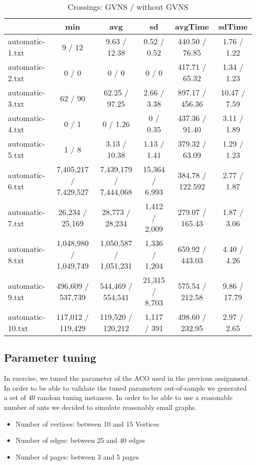 \documentclass{scrartcl}
\begin{document}
\begin{table}
\scriptsize
\begin{tabular}{lccccc}
  \toprule  & min & avg & sd & avgTime & sdTime \\ 
  \midrule automatic-1.txt & 9 / 12 & 9.63 / 12.38 & 0.52 / 0.52 & 440.50 / 76.85 & 1.76 / 1.22 \\ 
  automatic-2.txt & 0 / 0 & 0 / 0  & 0 / 0 & 417.71 / 65.32 & 1.34 / 1.23 \\ 
  automatic-3.txt & 62 / 90 & 62.25 / 97.25 & 2.66 / 3.38 & 897.17 / 456.36 & 10.47 / 7.59 \\ 
  automatic-4.txt & 0 / 1 & 0 / 1.26 & 0 / 0.35 & 437.36 / 91.40 & 3.11 / 1.89 \\ 
  automatic-5.txt & 1 / 8 & 3.13 / 10.38 & 1.13 / 1.41 & 379.32 / 63.09 & 1.29 / 1.23 \\ 
  automatic-6.txt & 7,405,217 / 7,429,527 & 7,439,179 / 7,444,068 & 15,364 / 6,993 & 384.78 / 122.592 & 2.77 / 1.87 \\ 
  automatic-7.txt & 26,234 / 25,169 & 28,773 / 28,234 & 1,412 / 2,009 & 279.07 / 165.43 & 1.87 / 3.06 \\ 
  automatic-8.txt & 1,048,980 / 1,049,749 & 1,050,587 / 1,051,231  & 1,336 / 1,204 & 659.92 / 443.03 & 4.40 / 4.26 \\ 
  automatic-9.txt & 496,609 / 537,739 & 544,469 / 554,541 & 21,315 / 8,703 & 575.54 / 212.58 & 9.86 / 17.79 \\ 
  automatic-10.txt & 117,012 / 119,429 & 119,520 / 120,212 & 1,117 / 391 & 498.60 / 232.95 & 2.97 / 2.65 \\ 
  \bottomrule 
\end{tabular}
\caption{Crossings: GVNS / without GVNS}
\label{tab:results}
\end{table}

\subsection{Parameter tuning}
In exercise, we tuned the parameter of the ACO used in the previous assignment. In order to be able to validate
the tuned parameters out-of-sample we generated a set of 40 random tuning instances. In order to be able to use
a reasonable number of ants we decided to simulate reasonably small graphs. 

\begin{itemize}
  \item Number of vertices: between 10 and 15 Vertices
  \item Number of edges: between 25 and 40 edges
  \item Number of pages: between 3 and 5 pages
\end{itemize}
\end{document}
